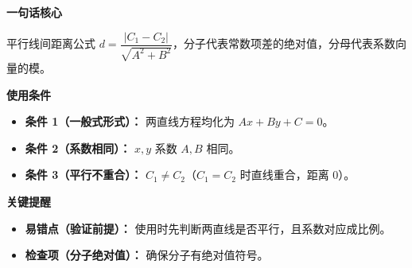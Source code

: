 \begin{summarybox}
	\textbf{\textcolor{CSummary}{一句话核心}}

	平行线间距离公式 $d=\dfrac{|C_1-C_2|}{\sqrt{A^2+B^2}}$，分子代表常数项差的绝对值，分母代表系数向量的模。

	\medskip
	\textbf{\textcolor{CSummary}{使用条件}}
	\begin{itemize}[leftmargin=*, itemsep=0.5em, topsep=0.4em]
		\item \textbf{条件 1（一般式形式）：} 两直线方程均化为 $Ax+By+C=0$。
		\item \textbf{条件 2（系数相同）：} $x,y$ 系数 $A,B$ 相同。
		\item \textbf{条件 3（平行不重合）：} $C_1\neq C_2$（$C_1=C_2$ 时直线重合，距离 $0$）。
	\end{itemize}

	\medskip
	\textbf{\textcolor{CSummary}{关键提醒}}
	\begin{itemize}[leftmargin=*, itemsep=0.5em, topsep=0.4em]
		\item \textbf{易错点（验证前提）：} 使用时先判断两直线是否平行，且系数对应成比例。
		\item \textbf{检查项（分子绝对值）：} 确保分子有绝对值符号。
	\end{itemize}
\end{summarybox}
